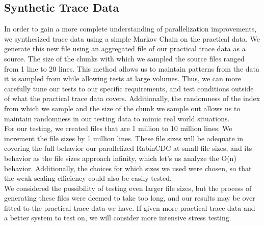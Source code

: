 \documentclass{acmtog} %
\begin{document}
	\subsection{Synthetic Trace Data}
	In order to gain a more complete understanding of parallelization improvements, we synthesized trace data using a simple Markov Chain on the practical data. We generate this new file using an aggregated file of our practical trace data as a source. The size of the chunks with which we sampled the source files ranged from 1 line to 20 lines. This method allows us to maintain patterns from the data it is sampled from while allowing tests at large volumes. Thus, we can more carefully tune our tests to our specific requirements, and test conditions outside of what the practical trace data covers. Additionally, the randomness of the index from which we sample and the size of the chunk we sample out allows us to maintain randomness in our testing data to mimic real world situations.\\
	
	For our testing, we created files that are 1 million to 10 million lines. We increment the file sizes by 1 million lines. These file sizes will be adequate in covering the full behavior our parallelized RabinCDC at small file sizes, and its behavior as the file sizes approach infinity, which let's us analyze the O(n) behavior. Additionally, the choices for which sizes we used were chosen, so that the weak scaling efficiency could also be easily tested.\\
	
	We considered the possibility of testing even larger file sizes, but the process of generating these files were deemed to take too long, and our results may be over fitted to the practical trace data we have. If given more practical trace data and a better system to test on, we will consider more intensive stress testing.
	
	
\end{document}
